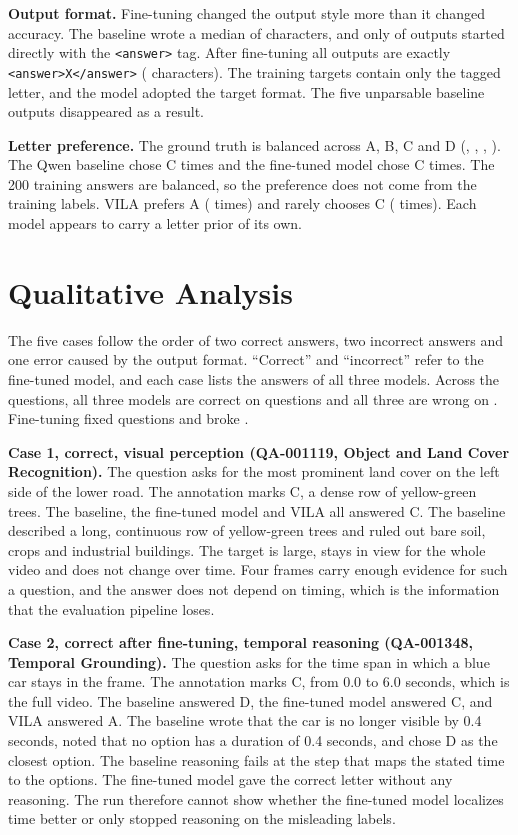 \documentclass[11pt]{article}
\begin{document}
\textbf{Output format.} Fine-tuning changed the output style more than it changed accuracy. The baseline wrote a median of \MedLenBase{} characters, and only \DirectBase{} of \NQ{} outputs started directly with the \texttt{<answer>} tag. After fine-tuning all \DirectSft{} outputs are exactly \texttt{<answer>X</answer>} (\MedLenSft{} characters). The training targets contain only the tagged letter, and the model adopted the target format. The five unparsable baseline outputs disappeared as a result.

\textbf{Letter preference.} The ground truth is balanced across A, B, C and D (\LetGtA, \LetGtB, \LetGtC, \LetGtD). The Qwen baseline chose C \LetBaseC{} times and the fine-tuned model chose C \LetSftC{} times. The 200 training answers are balanced, so the preference does not come from the training labels. VILA prefers A (\LetVilaA{} times) and rarely chooses C (\LetVilaC{} times). Each model appears to carry a letter prior of its own.

\section{Qualitative Analysis}

The five cases follow the order of two correct answers, two incorrect answers and one error caused by the output format. ``Correct'' and ``incorrect'' refer to the fine-tuned model, and each case lists the answers of all three models. Across the \NQ{} questions, all three models are correct on \AllRight{} questions and all three are wrong on \AllWrong{}. Fine-tuning fixed \Gain{} questions and broke \Loss{}.

\textbf{Case 1, correct, visual perception (QA-001119, Object and Land Cover Recognition).} The question asks for the most prominent land cover on the left side of the lower road. The annotation marks C, a dense row of yellow-green trees. The baseline, the fine-tuned model and VILA all answered C. The baseline described a long, continuous row of yellow-green trees and ruled out bare soil, crops and industrial buildings. The target is large, stays in view for the whole video and does not change over time. Four frames carry enough evidence for such a question, and the answer does not depend on timing, which is the information that the evaluation pipeline loses.

\textbf{Case 2, correct after fine-tuning, temporal reasoning (QA-001348, Temporal Grounding).} The question asks for the time span in which a blue car stays in the frame. The annotation marks C, from 0.0 to 6.0 seconds, which is the full video. The baseline answered D, the fine-tuned model answered C, and VILA answered A. The baseline wrote that the car is no longer visible by 0.4 seconds, noted that no option has a duration of 0.4 seconds, and chose D as the closest option. The baseline reasoning fails at the step that maps the stated time to the options. The fine-tuned model gave the correct letter without any reasoning. The run therefore cannot show whether the fine-tuned model localizes time better or only stopped reasoning on the misleading labels.
\end{document}

